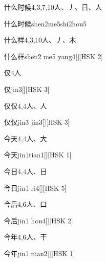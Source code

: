 \begin{entry}{什么时候}{4,3,7,10}{⼈、⼃、⽇、⼈}
  \begin{phonetics}{什么时候}{shen2me5shi2hou5}
  \end{phonetics}
\end{entry}

\begin{entry}{什么样}{4,3,10}{⼈、⼃、⽊}
  \begin{phonetics}{什么样}{shen2 me5 yang4}[][HSK 2]
  \end{phonetics}
\end{entry}

\begin{entry}{仅}{4}{⼈}
  \begin{phonetics}{仅}{jin3}[][HSK 3]
  \end{phonetics}
\end{entry}

\begin{entry}{仅仅}{4,4}{⼈、⼈}
  \begin{phonetics}{仅仅}{jin3 jin3}[][HSK 3]
  \end{phonetics}
\end{entry}

\begin{entry}{今天}{4,4}{⼈、⼤}
  \begin{phonetics}{今天}{jin1tian1}[][HSK 1]
  \end{phonetics}
\end{entry}

\begin{entry}{今日}{4,4}{⼈、⽇}
  \begin{phonetics}{今日}{jin1 ri4}[][HSK 5]
  \end{phonetics}
\end{entry}

\begin{entry}{今后}{4,6}{⼈、⼝}
  \begin{phonetics}{今后}{jin1 hou4}[][HSK 2]
  \end{phonetics}
\end{entry}

\begin{entry}{今年}{4,6}{⼈、⼲}
  \begin{phonetics}{今年}{jin1 nian2}[][HSK 1]
  \end{phonetics}
\end{entry}

